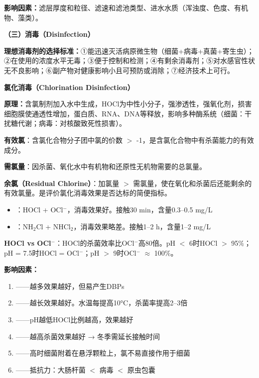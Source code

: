 \documentclass[10pt,a4paper,oneside]{ctexbook}
\begin{document}
\begin{keybox}
\textbf{影响因素：}滤层厚度和粒径、滤速和滤池类型、进水水质（浑浊度、色度、有机物、藻类）。

\textbf{（三）消毒（Disinfection）}

\textbf{理想消毒剂的选择标准：}①能迅速灭活病原微生物（细菌+病毒+真菌+寄生虫）；②在使用的浓度水平无毒；③便于控制和检测；④有剩余消毒剂；⑤对水感官性状无不良影响；⑥副产物对健康影响小且可预防或消除；⑦经济技术上可行。

\textbf{氯化消毒（Chlorination Disinfection）}

\textbf{原理：}含氯制剂加入水中生成，HOCl为中性小分子，强渗透性，强氧化剂，损害细胞膜使通透性增加，蛋白质、RNA、DNA等释放，影响多种酶系统（细菌：干扰糖代谢；病毒：对核酸致死性损害）。

\begin{defbox}
\textbf{有效氯}：含氯化合物分子团中氯的价数 $>$ -1，是含氯化合物中有杀菌能力的有效成分。

\textbf{需氯量}：因杀菌、氧化水中有机物和还原性无机物需要的总氯量。

\textbf{余氯（Residual Chlorine）}：加氯量 $>$ 需氯量，使在氧化和杀菌后还能剩余的有效氯量。是评价氯化消毒效果是否达标的简便指标。
\begin{itemize}
    \item {}：HOCl + OCl$^-$，消毒效果好。接触30 min，含量0.3--0.5 mg/L
    \item {}：NH$_2$Cl + NHCl$_2$，消毒效果略差。接触1--2 h，含量1--2 mg/L
\end{itemize}
\end{defbox}

\textbf{HOCl vs OCl$^-$}：HOCl的杀菌效率比OCl$^-$高80倍。pH $<$ 6时HOCl $>$ 95\%；pH = 7.5时HOCl = OCl$^-$；pH $>$ 9时OCl$^-$ $\approx$ 100\%。

\textbf{影响因素：}
\begin{enumerate}[leftmargin=*]
    \item {}——越多效果越好，但易产生DBPs
    \item {}——越长效果越好。水温每提高10°C，杀菌率提高2--3倍
    \item {}——pH越低HOCl比例越高，效果越好
    \item {}——越高杀菌效果越好 → 冬季需延长接触时间
    \item {}——高时细菌附着在悬浮颗粒上，氯不易直接作用于细菌
    \item {}——抵抗力：大肠杆菌 $<$ 病毒 $<$ 原虫包囊
\end{enumerate}


\end{keybox}
\end{document}

